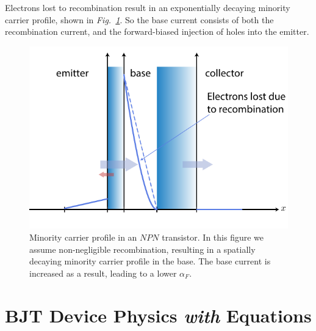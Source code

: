 Electrons lost to recombination result in an exponentially decaying minority carrier profile, shown in \emph{Fig.~\ref{fig:slide12_alpha_f}}.  So the base current consists of both the recombination current, and the forward-biased injection of holes into the emitter. 
\begin{figure}[H]
\centering
\includegraphics[width=\columnwidth]{slide12_alpha_f}
\caption{Minority carrier profile in an $NPN$ transistor.  In this figure we assume non-negligible recombination, resulting in a spatially decaying minority carrier profile in the base.  The base current is increased as a result, leading to a lower $\alpha_F$.}
\label{fig:slide12_alpha_f}
\end{figure}
\newpage
\section{BJT Device Physics \emph{with} Equations}
